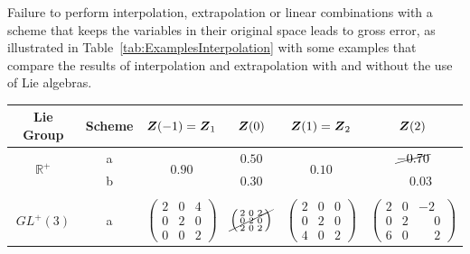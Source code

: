 \documentclass[12pt]{article}
\newcommand{\mbb}[1]{\mathbb{#1}}
\begin{document}
Failure to perform interpolation, extrapolation or linear combinations
with a scheme that keeps the variables in their original space leads
to gross error, as illustrated in
Table~\ref{tab:ExamplesInterpolation} with some examples that compare
the results of interpolation and extrapolation with and without the
use of Lie algebras.

\begin{table}[htbp]
  \begin{center}
    \begin{tabular}{ c c c c c c}
      \toprule
      Lie Group
      &
      Scheme
      &
      ${\boldsymbol{Z}}(-1) = {\boldsymbol{Z}}_1$
      &
      ${\boldsymbol{Z}}(0)$
      &
      ${\boldsymbol{Z}}(1) = {\boldsymbol{Z}}_2$
      &
      ${\boldsymbol{Z}}(2)$
      \\
      \hline
      \multirow{2}{*}{$\mbb{R}^+$}
      &
      a
      &
      \multirow{2}{*}{$0.90$}
      &
      $0.50$
      &
      \multirow{2}{*}{$0.10$}
      &
      $\cancel{-0.70}$
      \\
      
      &
      b
      &
      
      &
      $0.30$
      &
      
      &
      $\phantom{-}0.03$
      \\
      \\
      \multirow{4}{*}{$GL^+(3)$}
      &
      \multirow{2}{*}{a}
      &
      \multirow{4}{*}{
        $\left(
          \begin{smallmatrix}
            2 & 0 & 4\\
            0 & 2 & 0\\
            0 & 0 & 2
          \end{smallmatrix}
        \right)$}
      &
      \multirow{2}{*}{
        $\cancel{\left(
          \begin{smallmatrix}
            2 & 0 & 2\\
            0 & 2 & 0\\
            2 & 0 & 2
          \end{smallmatrix}
        \right)}$}
      &
      \multirow{4}{*}{
        $\left(
          \begin{smallmatrix}
            2 & 0 & 0\\
            0 & 2 & 0\\
            4 & 0 & 2
          \end{smallmatrix}
        \right)$}
      &
      \multirow{2}{*}{
        $\left(
          \begin{smallmatrix}
            2 & 0 & -2\\
            0 & 2 & \phantom{-}0\\
            6 & 0 & \phantom{-}2
          \end{smallmatrix}
        \right)$}
      \\
      \\


\end{tabular}
\end{center}
\end{table}
\end{document}
